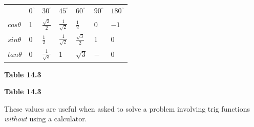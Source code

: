           \begin{table}[H]
        \begin{center}
      \label{m39408*id80733}
    \noindent
      \tablelasttail{}
      \begin{xtabular}[t]{|l|l|l|l|l|l|l|}\hline
         &
                ${0}^{\circ }$
               &
                ${30}^{\circ }$
               &
                ${45}^{\circ }$
               &
                ${60}^{\circ }$
               &
                ${90}^{\circ }$
               &
                ${180}^{\circ }$
     \tabularnewline{}
                $cos\theta $
               &
        1 &
                $\frac{\sqrt{3}}{2}$
               &
                $\frac{1}{\sqrt{2}}$
               &
                $\frac{1}{2}$
               &
        0 &
                $-1$
     \tabularnewline{}
                $sin\theta $
               &
        0 &
                $\frac{1}{2}$
               &
                $\frac{1}{\sqrt{2}}$
               &
                $\frac{\sqrt{3}}{2}$
               &
        1 &
        0%
     \tabularnewline{}
                $tan\theta $
               &
        0 &
                $\frac{1}{\sqrt{3}}$
               &
        1 &
                $\sqrt{3}$
               &
                $-$
               &
        0%
     \tabularnewline{}
    \end{xtabular}
      \end{center}
    \begin{center}{\small\bfseries Table 14.3}\end{center}
    \begin{caption}{\small\bfseries Table 14.3}\end{caption}
\end{table}
    \par
      \label{m39408*id81112}These values are useful when asked to solve a problem involving trig functions \textsl{without} using a calculator.\par 
